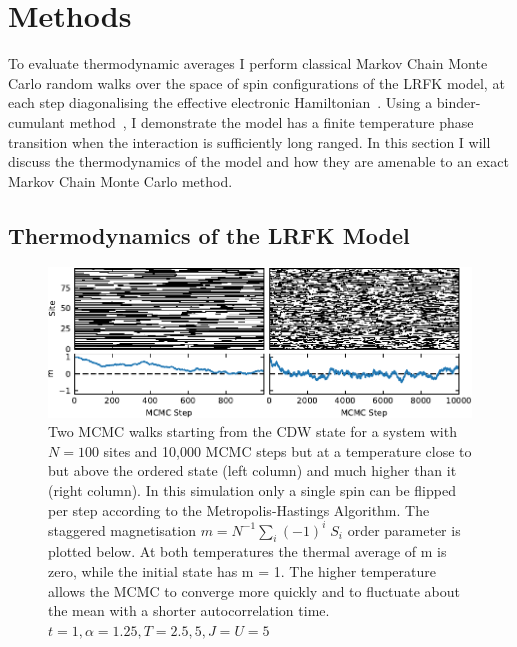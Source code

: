 \hypertarget{sec:lrfk-methods}{%
\section{Methods}\label{sec:lrfk-methods}}

To evaluate thermodynamic averages I perform classical Markov Chain Monte Carlo random walks over the space of spin configurations of the LRFK model, at each step diagonalising the effective electronic Hamiltonian~\autocite{maskaThermodynamicsTwodimensionalFalicovKimball2006}. Using a binder-cumulant method~\autocite{binderFiniteSizeScaling1981,musialMonteCarloSimulations2002}, I demonstrate the model has a finite temperature phase transition when the interaction is sufficiently long ranged. In this section I will discuss the thermodynamics of the model and how they are amenable to an exact Markov Chain Monte Carlo method.

\hypertarget{thermodynamics-of-the-lrfk-model}{%
\subsection{Thermodynamics of the LRFK Model}\label{thermodynamics-of-the-lrfk-model}}

\hypertarget{fig:raw_steps_single_flip}{%
\begin{figure}
\centering
\includegraphics[width=1\textwidth,height=\textheight]{figure_code/fk_chapter/lsr/pdf_figs/raw_steps_single_flip}
\caption[{Comparison of different proposal distributions}]{Two MCMC walks starting from the CDW state for a system with \(N = 100\) sites and 10,000 MCMC steps but at a temperature close to but above the ordered state (left column) and much higher than it (right column). In this simulation only a single spin can be flipped per step according to the Metropolis-Hastings Algorithm. The staggered magnetisation \(m = N^{-1} \sum_i (-1)^i \; S_i\) order parameter is plotted below. At both temperatures the thermal average of m is zero, while the initial state has m = 1. The higher temperature allows the MCMC to converge more quickly and to fluctuate about the mean with a shorter autocorrelation time. \(t = 1, \alpha = 1.25, T = {2.5,5}, J = U = 5\)}
\label{fig:raw_steps_single_flip}
\end{figure}
}

